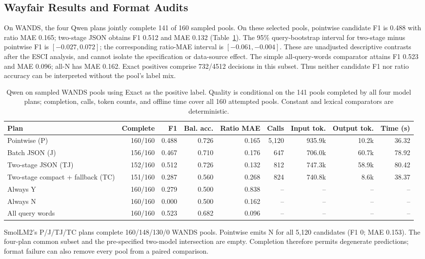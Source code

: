 \documentclass[conference]{IEEEtran}
\begin{document}
\subsection{Wayfair Results and Format Audits}
On WANDS, the four Qwen plans jointly complete 141 of 160 sampled pools. On these selected pools, pointwise candidate F1 is 0.488 with ratio MAE 0.165; two-stage JSON obtains F1 0.512 and MAE 0.132 (Table~\ref{tab:wands}). The 95\% query-bootstrap interval for two-stage minus pointwise F1 is $[-0.027,0.072]$; the corresponding ratio-MAE interval is $[-0.061,-0.004]$. These are unadjusted descriptive contrasts after the ESCI analysis, and cannot isolate the specification or data-source effect. The simple all-query-words comparator attains F1 0.523 and MAE 0.096; all-N has MAE 0.162. Exact positives comprise 732/4512 decisions in this subset. Thus neither candidate F1 nor ratio accuracy can be interpreted without the pool's label mix.

\begin{table}[t]
\caption{Qwen on sampled WANDS pools using Exact as the positive label. Quality is conditional on the 141 pools completed by all four model plans; completion, calls, token counts, and offline time cover all 160 attempted pools. Constant and lexical comparators are deterministic.}
\label{tab:wands}
\centering\small
\begin{tabular}{lrrrrrrrr}
\toprule
Plan & Complete & F1 & Bal. acc. & Ratio MAE & Calls & Input tok. & Output tok. & Time (s) \\
\midrule
Pointwise (P) & 160/160 & 0.488 & 0.726 & 0.165 & 5,120 & 935.9k & 10.2k & 36.32 \\
Batch JSON (J) & 156/160 & 0.467 & 0.710 & 0.176 & 647 & 706.0k & 60.7k & 78.92 \\
Two-stage JSON (TJ) & 152/160 & 0.512 & 0.726 & 0.132 & 812 & 747.3k & 58.9k & 80.42 \\
Two-stage compact + fallback (TC) & 151/160 & 0.287 & 0.560 & 0.268 & 824 & 740.8k & 8.6k & 38.37 \\
Always Y & 160/160 & 0.279 & 0.500 & 0.838 & -- & -- & -- & -- \\
Always N & 160/160 & 0.000 & 0.500 & 0.162 & -- & -- & -- & -- \\
All query words & 160/160 & 0.523 & 0.682 & 0.096 & -- & -- & -- & -- \\
\bottomrule
\end{tabular}
\end{table}


SmolLM2's P/J/TJ/TC plans complete 160/148/130/0 WANDS pools. Pointwise emits N for all 5,120 candidates (F1 0; MAE 0.153). The four-plan common subset and the pre-specified two-model intersection are empty. Completion therefore permits degenerate predictions; format failure can also remove every pool from a paired comparison.
\end{document}
